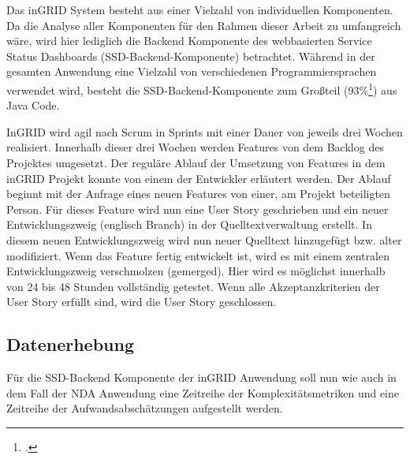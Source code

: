 Das inGRID System besteht aus einer Vielzahl von individuellen
Komponenten. Da die Analyse aller Komponenten für den Rahmen dieser
Arbeit zu umfangreich wäre, wird hier lediglich die Backend Komponente
des webbasierten Service Status Dashboards (SSD-Backend-Komponente)
betrachtet. Während in der gesamten Anwendung eine Vielzahl von
verschiedenen Programmiersprachen verwendet wird, besteht die
SSD-Backend-Komponente zum Großteil (93\%\footcite[Vgl. ][]{Anhang:
  ingrid-ssd-backend-code-language-analysis-github-linguist.txt}) aus
Java Code.

InGRID wird agil nach Scrum in Sprints mit einer Dauer von jeweils drei
Wochen realisiert. Innerhalb dieser drei Wochen werden Features von dem
Backlog des Projektes umgesetzt. Der reguläre Ablauf der Umsetzung von
Features in dem inGRID Projekt konnte von einem der Entwickler erläutert
werden. Der Ablauf beginnt mit der Anfrage eines neuen Features von
einer, am Projekt beteiligten Person. Für dieses Feature wird nun eine
User Story geschrieben und ein neuer Entwicklungszweig (englisch Branch)
in der Quelltextverwaltung erstellt. In diesem neuen Entwicklungszweig
wird nun neuer Quelltext hinzugefügt bzw. alter modifiziert. Wenn das
Feature fertig entwickelt ist, wird es mit einem zentralen
Entwicklungszweig verschmolzen (gemerged). Hier wird es möglichst
innerhalb von 24 bis 48 Stunden vollständig getestet. Wenn alle
Akzeptanzkriterien der User Story erfüllt sind, wird die User Story
geschlossen.

\subsection{Datenerhebung}\label{Datenerhebung}

Für die SSD-Backend Komponente der inGRID Anwendung soll nun wie auch in
dem Fall der NDA Anwendung eine Zeitreihe der Komplexitätsmetriken und
eine Zeitreihe der Aufwandsabschätzungen aufgestellt werden.

